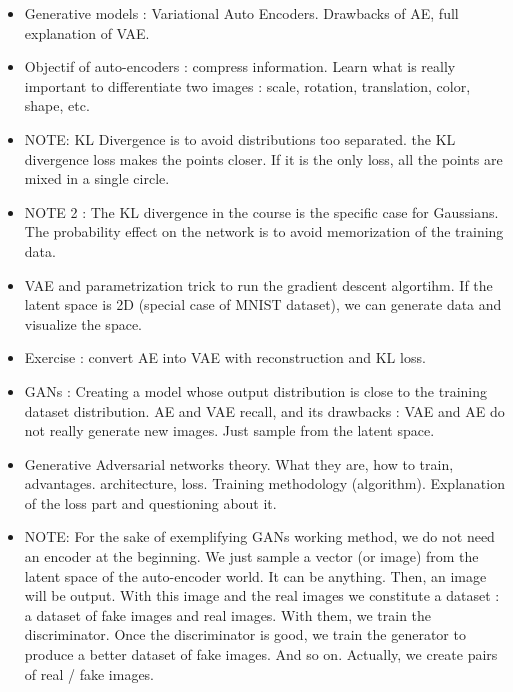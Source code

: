 \documentclass[12pt,a4paper]{article}
\begin{document}
\begin{itemize}
    \item Generative models : Variational Auto Encoders. Drawbacks of AE, full explanation of VAE.
    
    \item Objectif of auto-encoders : compress information. Learn what is really important to
    differentiate two images : scale, rotation, translation, color, shape, etc.
    
    \item NOTE: KL Divergence is to avoid distributions too separated. the KL divergence loss
    makes the points closer. If it is the only loss, all the points are mixed in a single circle.
    
    \item  NOTE 2 : The KL divergence in the course is the specific case for Gaussians. The probability
    effect on the network is to avoid memorization of the training data.
    
    
    \item VAE and parametrization trick to run the gradient descent algortihm. If the latent space is
    2D (special case of MNIST dataset), we can generate data and visualize the space.
    
    \item Exercise : convert AE into VAE with reconstruction and KL loss.
    
    \item GANs : Creating a model whose output distribution is close to the training dataset
    distribution. AE and VAE recall, and its drawbacks : VAE and AE do not really generate
    new images. Just sample from the latent space.
    
    \item Generative Adversarial networks theory. What they are, how to train, advantages. architecture, loss. Training
    methodology (algorithm).  Explanation of the loss part and questioning about it.
    
    
    \item NOTE: For the sake of exemplifying GANs working method, we do not need an encoder
    at the beginning. We just sample a vector (or image) from the latent space of the auto-encoder
    world. It can be anything. Then, an image will be output. With this image and the real
    images we constitute a dataset : a dataset of fake images and real images. With them, we
    train the discriminator. Once the discriminator is good, we train the generator to produce
    a better dataset of fake images. And so on. Actually, we create pairs of real / fake images.
    

\end{itemize}
\end{document}
